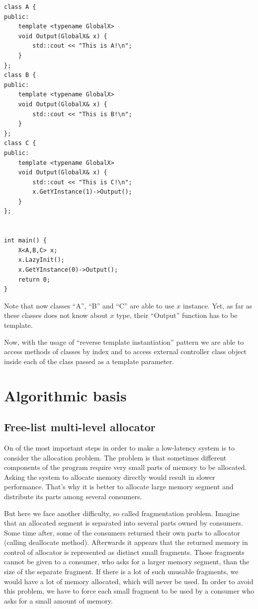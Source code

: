 \documentclass{article}
\begin{document}
\begin{lstlisting}
class A {
public:
    template <typename GlobalX>
    void Output(GlobalX& x) {
        std::cout << "This is A!\n";
    }
};
class B {
public:
    template <typename GlobalX>
    void Output(GlobalX& x) {
        std::cout << "This is B!\n";
    }
};
class C {
public:
    template <typename GlobalX>
    void Output(GlobalX& x) {
        std::cout << "This is C!\n";
        x.GetYInstance(1)->Output();
    }
};


int main() {
    X<A,B,C> x;
    x.LazyInit();
    x.GetYInstance(0)->Output();
    return 0;
}
\end{lstlisting}
Note that now classes ``A'', ``B'' and ``C'' are able to use $x$ instance. Yet, as far as these classes does not know about $x$ type, their ``Output'' function has to be template.

Now, with the usage of ``reverse template instantiation'' pattern we are able to access methods of classes by index and to access external controller class object inside each of the class passed as a template parameter.

\section{Algorithmic basis}

\subsection{Free-list multi-level allocator}
\label{free_list_algo}

On of the most important steps in order to make a low-latency system is to consider the allocation problem. The problem is that sometimes different components of the program require very small parts of memory to be allocated. Asking the system to allocate memory directly would result in slower performance. That's why it is better to allocate large memory segment and distribute its parts among several consumers.

But here we face another difficulty, so called fragmentation problem. Imagine that an allocated segment is separated into several parts owned by consumers. Some time after, some of the consumers returned their own parts to allocator (calling deallocate method). Afterwards it appears that the returned memory in control of allocator is represented as distinct small fragments. Those fragments cannot be given to a consumer, who asks for a larger memory segment, than the size of the separate fragment. If there is a lot of such unusable fragments, we would have a lot of memory allocated, which will never be used. In order to avoid this problem, we have to force each small fragment to be used by a consumer who asks for a small amount of memory.
\end{document}
